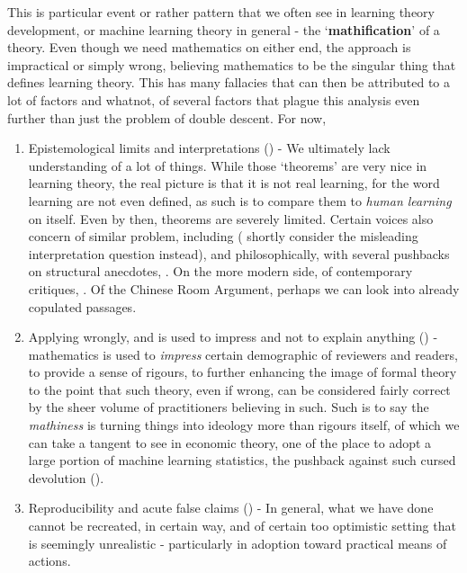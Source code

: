 This is particular event or rather pattern that we often see in learning theory development, or machine learning theory in general - the `\textbf{mathification}' of a theory. Even though we need mathematics on either end, the approach is impractical or simply wrong, believing mathematics to be the singular thing that defines learning theory. This has many fallacies that can then be attributed to a lot of factors and whatnot, of several factors that plague this analysis even further than just the problem of double descent. For now, 
\begin{enumerate}[itemsep=2pt,topsep=1pt]
    \item Epistemological limits and interpretations (\cite{electronics13020416}) - We ultimately lack understanding of a lot of things. While those `theorems' are very nice in learning theory, the real picture is that it is not real learning, for the word learning are not even defined, as such is to compare them to \textit{human learning} on itself. Even by then, theorems are severely limited. Certain voices also concern of similar problem, including \cite{lipton2016mythos,doshi2017towards,molnar2020general} (\cite{molnar2020general} shortly consider the misleading interpretation question instead), and philosophically, with several pushbacks on structural anecdotes, \cite{dreyfus1965alchemy,dreyfus1972what,dreyfus1986mind,suchman1987plans,brooks1991intelligence,searle1980minds,mccarthy1969philosophical,harnad1990symbol}. On the more modern side, of contemporary critiques, \cite{pearl2009causality,marcus2018deep,sutton2019bitter}. Of the Chinese Room Argument, perhaps we can look into already copulated passages. 
    \item Applying wrongly, and is used to impress and not to explain anything (\cite{lipton2018troublingtrendsmachinelearning}) - mathematics is used to \textit{impress} certain demographic of reviewers and readers, to provide a sense of rigours, to further enhancing the image of formal theory to the point that such theory, even if wrong, can be considered fairly correct by the sheer volume of practitioners believing in such. Such is to say the \textit{mathiness} is turning things into ideology more than rigours itself, of which we can take a tangent to see in economic theory, one of the place to adopt a large portion of machine learning statistics, the pushback against such cursed devolution (\cite{romer2015mathiness,syll2024postreal}). 
    \item Reproducibility and acute false claims (\cite{kapoor2022leakage}) - In general, what we have done cannot be recreated, in certain way, and of certain too optimistic setting that is seemingly unrealistic - particularly in adoption toward practical means of actions. 
\end{enumerate}
